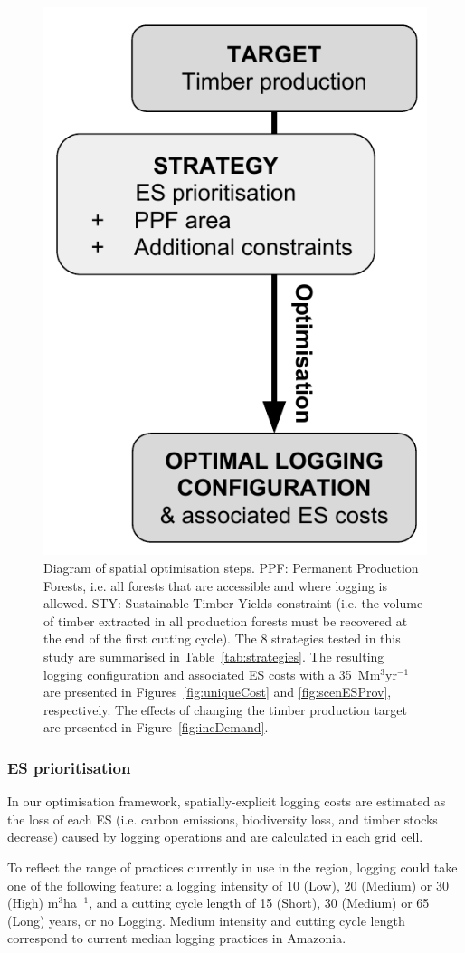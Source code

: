 \documentclass{article}
\begin{document}
\begin{figure}
    \centering
    \includegraphics[width = 0.4\linewidth]{graphs/diagramSpatOptim}
    \caption{Diagram of spatial optimisation steps. PPF: Permanent Production Forests, i.e. all forests that are accessible and where logging is allowed. STY: Sustainable Timber Yields constraint (i.e. the volume of timber extracted in all production forests must be recovered at the end of the first cutting cycle). The 8 strategies tested in this study are summarised in Table~\ref{tab:strategies}. The resulting logging configuration and associated ES costs with a 35~Mm$^3$yr$^{-1}$ are presented in Figures~\ref{fig:uniqueCost} and \ref{fig:scenESProv}, respectively. The effects of changing the timber production target are presented in Figure~\ref{fig:incDemand}.}
    \label{fig:basicDiagram}
\end{figure}

\subsubsection{ES prioritisation}
\label{sec:defPPF}

In our optimisation framework, spatially-explicit logging costs are estimated as the loss of each ES (i.e. carbon emissions, biodiversity loss, and timber stocks decrease) caused by logging operations and are calculated in each grid cell.

To reflect the range of practices currently in use in the region, logging could take one of the following feature: a logging intensity of 10 (Low), 20 (Medium) or 30 (High) m$^3$ha$^{−1}$, and a cutting cycle length of 15 (Short), 30 (Medium) or 65 (Long) years, or no Logging. Medium intensity and cutting cycle length correspond to current median logging practices in Amazonia. 
\end{document}
